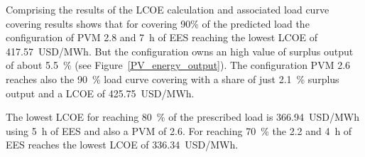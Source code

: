 Comprising the results of the LCOE calculation and associated load curve covering results shows that for covering 90\% of the predicted load the configuration of PVM 2.8 and \SI{7}{h} of EES reaching the lowest LCOE of \SI{417.57}{USD/MWh}. But the configuration owns an high value of surplus output of about 5.5~\% (see Figure~\ref{PV_energy_output}). The configuration PVM 2.6 reaches also the 90~\% load curve covering with a share of just 2.1~\% surplus output and a LCOE of \SI{425.75}{USD/MWh}.

The lowest LCOE for reaching 80~\% of the prescribed load is \SI{366.94}{USD/MWh} using \SI{5}{h} of EES and also a PVM of 2.6. For reaching 70~\% the 2.2 and \SI{4}{h} of EES reaches the lowest LCOE of \SI{336.34}{USD/MWh}.
\pagebreak